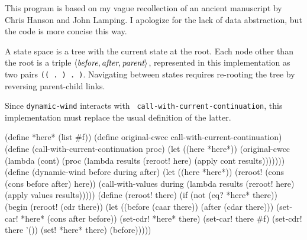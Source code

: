 \vspace{2ex}




This program is based on my vague recollection of an ancient
manuscript by Chris Hanson and John Lamping.  I apologize for the lack
of data abstraction, but the code is more concise this way.

A state space is a tree with the current state at the root.  Each node other
than the root is a triple $\langle\hbox{\em{}before}, \hbox{\em{}after},
\hbox{\em{}parent}\rangle$, represented in this implementation as two pairs
{\tt(( .\ ) .\ )}.
Navigating between states requires re-rooting the tree by reversing
parent-child links.

Since {\tt dynamic-wind} interacts with {\tt
call-with-current-continuation}, this implementation must replace the
usual definition of the latter.

\begin{code}
(define *here* (list #f))
\codeskip
(define original-cwcc call-with-current-continuation)
\codeskip
(define (call-with-current-continuation proc)
  (let ((here *here*))
    (original-cwcc (lambda (cont)
                     (proc (lambda results
                             (reroot! here)
                             (apply cont results)))))))
\codeskip
(define (dynamic-wind before during after)
  (let ((here *here*))
    (reroot! (cons (cons before after) here))
    (call-with-values during
      (lambda results
        (reroot! here)
        (apply values results)))))
\codeskip
(define (reroot! there)
  (if (not (eq? *here* there))
      (begin (reroot! (cdr there))
             (let ((before (caar there))
                   (after (cdar there)))
               (set-car! *here* (cons after before))
               (set-cdr! *here* there)
               (set-car! there #f)
               (set-cdr! there '())
               (set! *here* there)
               (before)))))
\end{code}



